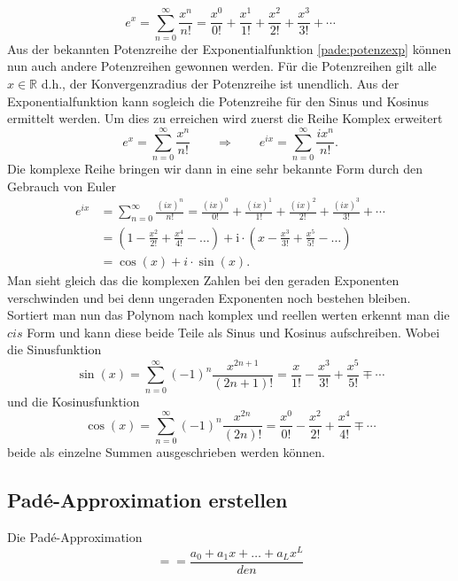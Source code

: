 \begin{equation}
e^{x}
=
\sum_{n=0}^{\infty} \frac{x^{n}}{n !}
=
\frac{x^{0}}{0 !}+\frac{x^{1}}{1 !}+\frac{x^{2}}{2 !}+\frac{x^{3}}{3 !}+\cdots 
\label{pade:potenzexp}
\end{equation}
Aus der bekannten Potenzreihe der Exponentialfunktion \ref{pade:potenzexp} können nun auch andere Potenzreihen gewonnen werden.
Für die Potenzreihen gilt alle $x \in \mathbb{R}$ d.h., der Konvergenzradius der Potenzreihe ist unendlich. 
Aus der Exponentialfunktion kann sogleich die Potenzreihe für den Sinus und Kosinus ermittelt werden.
Um dies zu erreichen wird zuerst die Reihe Komplex erweitert
\begin{equation*}
e^{x}
=
\sum_{n=0}^{\infty} \frac{x^{n}}{n !}
\qquad\Rightarrow\qquad
e^{ix}
=
\sum_{n=0}^{\infty} \frac{ix^{n}}{n !}.
\end{equation*}
Die komplexe Reihe bringen wir dann in eine sehr bekannte Form durch den Gebrauch von Euler 
\begin{align*}
e^{ix}
&=
\sum_{n=0}^{\infty} \frac{(ix)^{n}}{n !}
=
\frac{(ix)^{0}}{0 !}+\frac{(ix)^{1}}{1 !}+\frac{(ix)^{2}}{2 !}+\frac{(ix)^{3}}{3 !}+\cdots
\\
&=
\left(1-\frac{x^{2}}{2 !}+\frac{x^{4}}{4 !}-\ldots\right)+\mathrm{i} \cdot\left(x-\frac{x^{3}}{3 !}+\frac{x^{5}}{5 !}-\ldots\right)
\\
&=
\cos(x)+i\cdot \sin(x).
\end{align*}
Man sieht gleich das die komplexen Zahlen bei den geraden Exponenten verschwinden und bei denn ungeraden Exponenten noch bestehen bleiben. 
Sortiert man nun das Polynom nach komplex und reellen werten erkennt man die $cis$ Form und kann diese beide Teile als Sinus und Kosinus aufschreiben.
Wobei die Sinusfunktion 
\begin{equation*}
\sin (x)=\sum_{n=0}^{\infty}(-1)^{n} \frac{x^{2 n+1}}{(2 n+1) !}=\frac{x}{1 !}-\frac{x^{3}}{3 !}+\frac{x^{5}}{5 !} \mp \cdots
\end{equation*}
und die Kosinusfunktion 
\begin{equation*}
\cos (x)=\sum_{n=0}^{\infty}(-1)^{n} \frac{x^{2 n}}{(2 n) !}=\frac{x^{0}}{0 !}-\frac{x^{2}}{2 !}+\frac{x^{4}}{4 !} \mp \cdots
\end{equation*}
beide als einzelne Summen ausgeschrieben werden können.



\subsection{Padé-Approximation erstellen
	\label{pade:subsection:Pade_erstellen}}

Die Padé-Approximation 
\begin{equation}
[L/M] = 
=
\frac{a_0 + a_1 x + \dots + a_L x^L}{den}
\end{equation}






